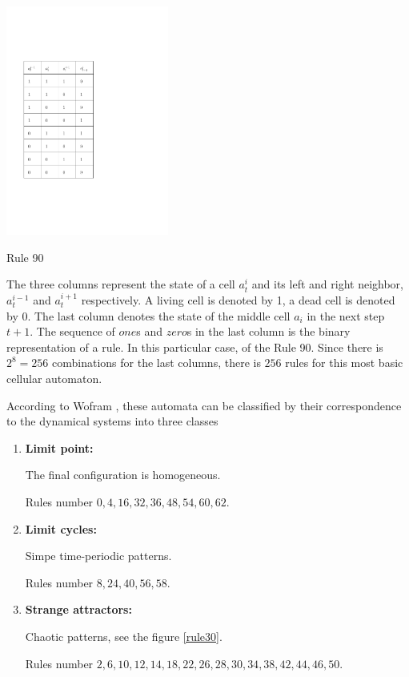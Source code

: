 \begin{enumerate}
\begin{table}[htbp]
 \centering
 \includegraphics[width=0.4\textwidth]{./img/1Drule}
 \caption{Rule 90}
 \label{rule90}
\end{table}


The three columns represent the state of a cell $a_t^i$ and its left and right neighbor, $a_t^{i-1}$ and $a_t^{i+1}$ respectively. A living cell is denoted by 1, a dead cell is denoted by 0. The last column denotes the state of the middle cell $a_i$ in the next step $t+1$. The sequence of $one$s and $zero$s in the last column is the binary representation of a rule. In this particular case, of the Rule 90.
Since there is $2^8=256$ combinations for the last columns, there is $256$ rules for this most basic cellular automaton.

According to Wofram \cite{wolf}, these automata can be classified by their correspondence to the dynamical systems into three classes \cite{wolf}
\begin{enumerate}
\item \textbf{Limit point:}

The final configuration is homogeneous. 

Rules number $0,4,16,32,36,48,54,60,62$.

\item \textbf{Limit cycles:}

Simpe time-periodic patterns. 

Rules number $8,24,40,56,58$.

\item \textbf{Strange attractors:}

Chaotic patterns, see the figure \ref{rule30}. 

Rules number $2,6,10,12,14,18,22,26,28,30,34,38,42,44,46,50$.

%
%
%
\end{enumerate}


\end{enumerate}

